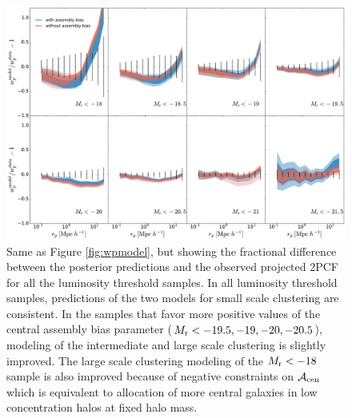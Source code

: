 \documentclass[twocolumn]{aastex61}
\newcommand{\acen}{\mathcal{A}_{\rm cen}}
\begin{document}
\begin{figure}[p]~\\
\begin{center}
\includegraphics[width=\textwidth]{wpres.pdf}
\caption{Same as Figure \ref{fig:wpmodel}, but showing the fractional difference between the posterior predictions and the observed projected 2PCF for all the luminosity threshold samples. In all luminosity threshold samples, predictions of the two models for small scale clustering are consistent. In the samples that favor more positive values of the central assembly bias parameter ($M_{\rm r}<-19.5,-19,-20,-20.5$), modeling of the intermediate and large scale clustering is slightly improved. The large scale clustering modeling of the $M_{\rm r}<-18$ sample is also improved because of negative constraints on $\acen$ which is equivalent to allocation of more central galaxies in low concentration halos at fixed halo mass.}
\label{fig:wpres}
\end{center}
\end{figure}

\end{document}

